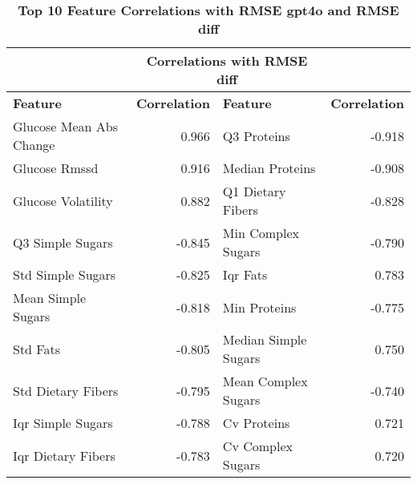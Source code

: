 \begin{table}[h]
\centering
{}  %
\begin{tabular}{|l|r|l|r|}
\hline
\rowcolor{gray!25}  %
\multicolumn{2}{|c|}{\textbf{Correlations with RMSE gpt4o}} & \multicolumn{2}{c|}{\textbf{Correlations with RMSE diff}} \\
\hline
\rowcolor{gray!25}  %
\textbf{Feature} & \textbf{Correlation} & \textbf{Feature} & \textbf{Correlation} \\
\hline
Glucose Mean Abs Change & 0.966 & Q3 Proteins & -0.918 \\
Glucose Rmssd & 0.916 & Median Proteins & -0.908 \\
Glucose Volatility & 0.882 & Q1 Dietary Fibers & -0.828 \\
Q3 Simple Sugars & -0.845 & Min Complex Sugars & -0.790 \\
Std Simple Sugars & -0.825 & Iqr Fats & 0.783 \\
Mean Simple Sugars & -0.818 & Min Proteins & -0.775 \\
Std Fats & -0.805 & Median Simple Sugars & 0.750 \\
Std Dietary Fibers & -0.795 & Mean Complex Sugars & -0.740 \\
Iqr Simple Sugars & -0.788 & Cv Proteins & 0.721 \\
Iqr Dietary Fibers & -0.783 & Cv Complex Sugars & 0.720 \\
\hline
\end{tabular}
\caption{\textbf{Top 10 Feature Correlations with RMSE gpt4o and RMSE diff}}
\label{tab:correlations}
\end{table}